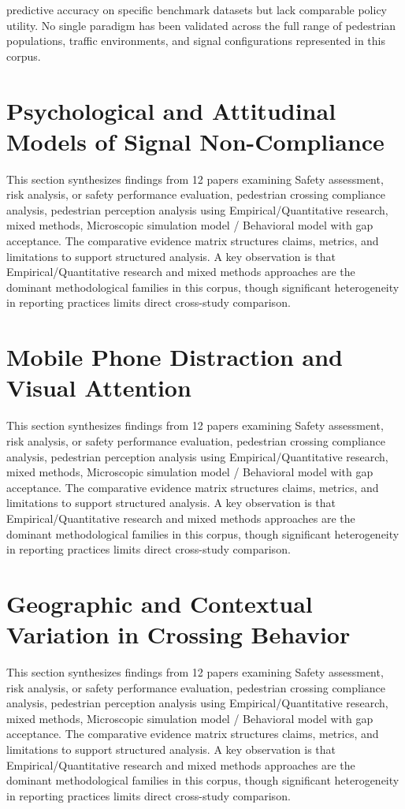 \documentclass{article}
\begin{document}
predictive accuracy on specific benchmark datasets but lack comparable policy utility. No single paradigm has been validated across the full range of pedestrian populations, traffic environments, and signal configurations represented in this corpus.

\section{Psychological and Attitudinal Models of Signal Non-Compliance}
This section synthesizes findings from 12 papers examining Safety assessment, risk analysis, or safety performance evaluation, pedestrian crossing compliance analysis, pedestrian perception analysis using Empirical/Quantitative research, mixed methods, Microscopic simulation model / Behavioral model with gap acceptance. The comparative evidence matrix structures claims, metrics, and limitations to support structured analysis. A key observation is that Empirical/Quantitative research and mixed methods approaches are the dominant methodological families in this corpus, though significant heterogeneity in reporting practices limits direct cross-study comparison.

\section{Mobile Phone Distraction and Visual Attention}
This section synthesizes findings from 12 papers examining Safety assessment, risk analysis, or safety performance evaluation, pedestrian crossing compliance analysis, pedestrian perception analysis using Empirical/Quantitative research, mixed methods, Microscopic simulation model / Behavioral model with gap acceptance. The comparative evidence matrix structures claims, metrics, and limitations to support structured analysis. A key observation is that Empirical/Quantitative research and mixed methods approaches are the dominant methodological families in this corpus, though significant heterogeneity in reporting practices limits direct cross-study comparison.

\section{Geographic and Contextual Variation in Crossing Behavior}
This section synthesizes findings from 12 papers examining Safety assessment, risk analysis, or safety performance evaluation, pedestrian crossing compliance analysis, pedestrian perception analysis using Empirical/Quantitative research, mixed methods, Microscopic simulation model / Behavioral model with gap acceptance. The comparative evidence matrix structures claims, metrics, and limitations to support structured analysis. A key observation is that Empirical/Quantitative research and mixed methods approaches are the dominant methodological families in this corpus, though significant heterogeneity in reporting practices limits direct cross-study comparison.
\end{document}
